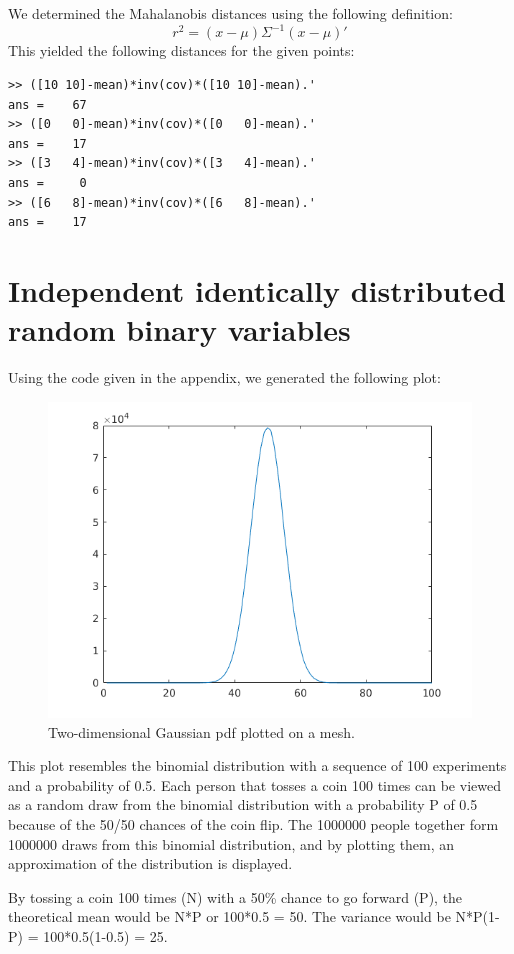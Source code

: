 \documentclass[10pt]{article}
\begin{document}
\subsection{}
We determined the Mahalanobis distances using the following definition:
\begin{equation}
r^2=(x-\mu)\Sigma^{-1}(x-\mu)'
\end{equation}
This yielded the following distances for the given points:
\begin{lstlisting}
>> ([10 10]-mean)*inv(cov)*([10 10]-mean).'
ans =    67
>> ([0   0]-mean)*inv(cov)*([0   0]-mean).'
ans =    17
>> ([3   4]-mean)*inv(cov)*([3   4]-mean).'
ans =     0
>> ([6   8]-mean)*inv(cov)*([6   8]-mean).'
ans =    17
\end{lstlisting}

\section{Independent identically distributed random binary variables}
Using the code given in the appendix, we generated the following plot:
\begin{figure}[H]
 \centering
 \includegraphics[width=.7\textwidth]{Ass4.png}
 \caption{Two-dimensional Gaussian pdf plotted on a mesh.}
 \label{4}
\end{figure}

This plot resembles the binomial distribution with a sequence of 100 experiments and a probability of 0.5. 
Each person that tosses a coin 100 times can be viewed as a random draw
from the binomial distribution with a probability P of 0.5 because of the 50/50 chances of the coin flip.
The 1000000 people together form 1000000 draws from this binomial
distribution, and by plotting them, an approximation of the distribution
is displayed.

By tossing a coin 100 times (N) with a 50\% chance to go forward (P),
the theoretical mean would be N*P or 100*0.5 = 50.
The variance would be N*P(1-P) = 100*0.5(1-0.5) = 25.
\end{document}
